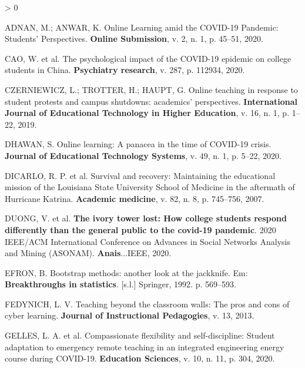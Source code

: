 \documentclass[
  12pt,
  portuguese,
]{article}
\newlength{\cslhangindent}
\newenvironment{CSLReferences}[2] %
 {%
  \setlength{\parindent}{0pt}
  \ifodd #1 \everypar{\setlength{\hangindent}{\cslhangindent}}\ignorespaces\fi
  \ifnum #2 > 0
  \setlength{\parskip}{#2\baselineskip}
  \fi
 }%
 {}
\begin{document}
\hypertarget{refs}{}
\begin{CSLReferences}{0}{1}
\leavevmode\hypertarget{ref-adnan2020online}{}%
ADNAN, M.; ANWAR, K. Online Learning amid the COVID-19 Pandemic:
Students' Perspectives. \textbf{Online Submission}, v. 2, n. 1, p.
45--51, 2020.

\leavevmode\hypertarget{ref-cao2020psychological}{}%
CAO, W. et al. The psychological impact of the COVID-19 epidemic on
college students in China. \textbf{Psychiatry research}, v. 287, p.
112934, 2020.

\leavevmode\hypertarget{ref-czerniewicz2019online}{}%
CZERNIEWICZ, L.; TROTTER, H.; HAUPT, G. Online teaching in response to
student protests and campus shutdowns: academics' perspectives.
\textbf{International Journal of Educational Technology in Higher
Education}, v. 16, n. 1, p. 1--22, 2019.

\leavevmode\hypertarget{ref-dhawan2020online}{}%
DHAWAN, S. Online learning: A panacea in the time of COVID-19 crisis.
\textbf{Journal of Educational Technology Systems}, v. 49, n. 1, p.
5--22, 2020.

\leavevmode\hypertarget{ref-dicarlo2007survival}{}%
DICARLO, R. P. et al. Survival and recovery: Maintaining the educational
mission of the Louisiana State University School of Medicine in the
aftermath of Hurricane Katrina. \textbf{Academic medicine}, v. 82, n. 8,
p. 745--756, 2007.

\leavevmode\hypertarget{ref-duong2020ivory}{}%
DUONG, V. et al. \textbf{The ivory tower lost: How college students
respond differently than the general public to the covid-19 pandemic}.
2020 IEEE/ACM International Conference on Advances in Social Networks
Analysis and Mining (ASONAM). \textbf{Anais}...IEEE, 2020.

\leavevmode\hypertarget{ref-efron1992bootstrap}{}%
EFRON, B. Bootstrap methods: another look at the jackknife. Em:
\textbf{Breakthroughs in statistics}. {[}s.l.{]} Springer, 1992. p.
569--593.

\leavevmode\hypertarget{ref-fedynich2013teaching}{}%
FEDYNICH, L. V. Teaching beyond the classroom walls: The pros and cons
of cyber learning. \textbf{Journal of Instructional Pedagogies}, v. 13,
2013.

\leavevmode\hypertarget{ref-compassionate}{}%
GELLES, L. A. et al. Compassionate flexibility and self-discipline:
Student adaptation to emergency remote teaching in an integrated
engineering energy course during COVID-19. \textbf{Education Sciences},
v. 10, n. 11, p. 304, 2020.


\end{CSLReferences}
\end{document}
